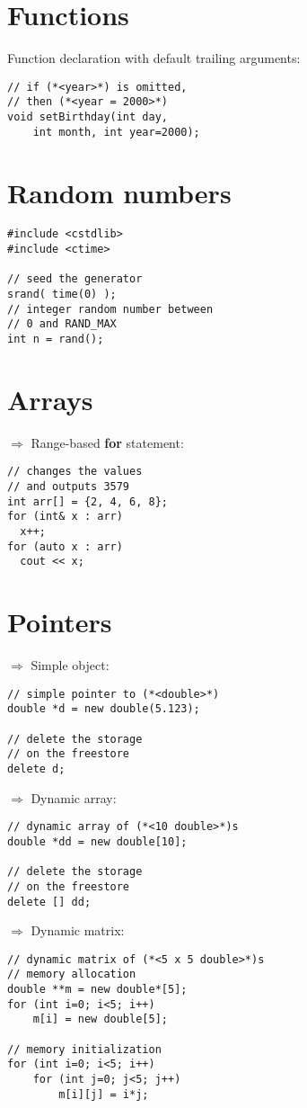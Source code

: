 \documentclass[10pt]{article}
\begin{document}
\begin{multicols*}{3}
\section*{Functions}
\small
Function declaration with
default trailing arguments:
\begin{lstlisting}
// if (*<year>*) is omitted, 
// then (*<year = 2000>*)
void setBirthday(int day,
    int month, int year=2000);
\end{lstlisting}
%
%
\section*{Random numbers}
\small
\begin{lstlisting}
#include <cstdlib>
#include <ctime>

// seed the generator
srand( time(0) );
// integer random number between
// 0 and RAND_MAX
int n = rand();
\end{lstlisting}
\columnbreak
%
%
\section*{Arrays}
\small
$\Rightarrow$ Range-based \textbf{for} statement:
\begin{lstlisting}
// changes the values 
// and outputs 3579
int arr[] = {2, 4, 6, 8};
for (int& x : arr)
  x++;
for (auto x : arr)
  cout << x;
\end{lstlisting}
%
%
\section*{Pointers}
\small
$\Rightarrow$ Simple object:
\begin{lstlisting}
// simple pointer to (*<double>*)
double *d = new double(5.123);

// delete the storage
// on the freestore
delete d;
\end{lstlisting}
$\Rightarrow$ Dynamic array:
\begin{lstlisting}
// dynamic array of (*<10 double>*)s
double *dd = new double[10];

// delete the storage
// on the freestore
delete [] dd;
\end{lstlisting}
$\Rightarrow$ Dynamic matrix:
\begin{lstlisting}
// dynamic matrix of (*<5 x 5 double>*)s
// memory allocation
double **m = new double*[5];
for (int i=0; i<5; i++)
    m[i] = new double[5];

// memory initialization    
for (int i=0; i<5; i++)
    for (int j=0; j<5; j++)
        m[i][j] = i*j;


\end{lstlisting}
\end{multicols*}
\end{document}

